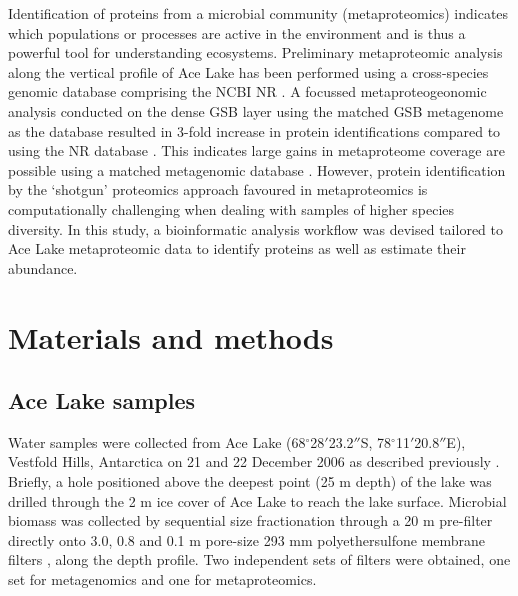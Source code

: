 Identification of proteins from a microbial community (metaproteomics) indicates which populations or processes are active in the environment and is thus a powerful tool for understanding ecosystems.
Preliminary metaproteomic analysis along the vertical profile of Ace Lake has been performed using a cross-species genomic database comprising the \ac{NCBI} \ac{NR} \cite{Ng2010b}.
A focussed metaproteogeonomic analysis conducted on the dense \ac{GSB} layer using the matched \ac{GSB} metagenome as the database resulted in 3-fold increase in protein identifications compared to using the \ac{NR} database \cite{Ng2010b}.
This indicates large gains in metaproteome coverage are possible using a matched metagenomic database \cite{Ng2010b}.
However, protein identification by the `shotgun' proteomics approach favoured in metaproteomics \cite{Ram2005} is computationally challenging when dealing with samples of higher species diversity.
In this study, a bioinformatic analysis workflow was devised tailored to Ace Lake metaproteomic data to identify proteins as well as estimate their abundance.



\section{Materials and methods}
\label{sec:ace_mm}
\subsection{Ace Lake samples}
Water samples were collected from Ace Lake (68$^{\circ}$28$'$23.2$''$S, 78$^{\circ}$11$'$20.8$''$E), Vestfold Hills, Antarctica on 21 and 22 December 2006 as described previously \cite{Ng2010a, Ng2010b, Lauro2011}. 
Briefly, a hole positioned above the deepest point (25 m depth) of the lake was drilled through the 2 m ice cover of Ace Lake to reach the lake surface.
Microbial biomass was collected by sequential size fractionation through a 20 \textmu{}m pre-filter directly onto 3.0, 0.8 and 0.1 \textmu{}m pore-size 293 mm polyethersulfone membrane filters \cite{Rusch2007}, along the depth profile.
Two independent sets of filters were obtained, one set for metagenomics and one for metaproteomics.

